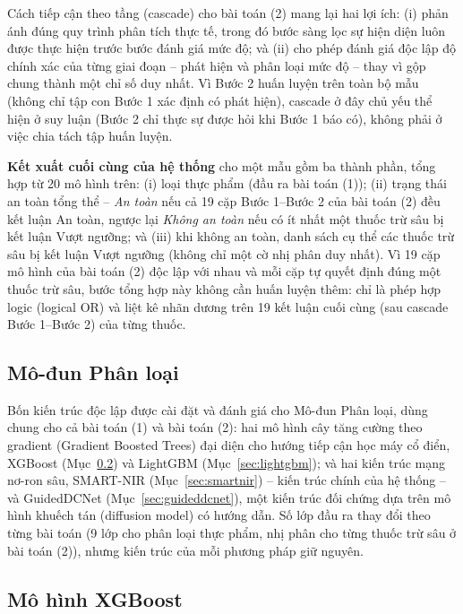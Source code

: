 \documentclass[10pt,twocolumn,twoside]{article}
\begin{document}
Cách tiếp cận theo tầng (cascade) cho bài toán (2) mang lại hai lợi ích: (i)
phản ánh đúng quy trình phân tích thực tế, trong đó bước sàng lọc sự hiện
diện luôn được thực hiện trước bước đánh giá mức độ; và (ii) cho phép đánh
giá độc lập độ chính xác của từng giai đoạn -- phát hiện và phân loại mức
độ -- thay vì gộp chung thành một chỉ số duy nhất. Vì Bước 2 huấn luyện
trên toàn bộ mẫu (không chỉ tập con Bước 1 xác định có phát hiện), cascade ở
đây chủ yếu thể hiện ở suy luận (Bước 2 chỉ thực sự được hỏi khi Bước 1 báo
có), không phải ở việc chia tách tập huấn luyện.

\textbf{Kết xuất cuối cùng của hệ thống} cho một mẫu gồm ba thành phần, tổng
hợp từ 20 mô hình trên: (i) loại thực phẩm (đầu ra bài toán (1)); (ii) trạng
thái an toàn tổng thể -- \emph{An toàn} nếu cả 19 cặp Bước 1--Bước 2 của bài
toán (2) đều kết luận An toàn, ngược lại \emph{Không an toàn} nếu có ít nhất
một thuốc trừ sâu bị kết luận Vượt ngưỡng; và (iii) khi không an toàn, danh
sách cụ thể các thuốc trừ sâu bị kết luận Vượt ngưỡng (không chỉ một cờ nhị
phân duy nhất). Vì 19 cặp mô hình của bài toán (2) độc lập với nhau và mỗi
cặp tự quyết định đúng một thuốc trừ sâu, bước tổng hợp này không cần huấn
luyện thêm: chỉ là phép hợp logic (logical OR) và liệt kê nhãn dương trên 19
kết luận cuối cùng (sau cascade Bước 1--Bước 2) của từng thuốc.

\subsection{Mô-đun Phân loại}
\label{sec:module-clf}

Bốn kiến trúc độc lập được cài đặt và đánh giá cho Mô-đun Phân loại, dùng
chung cho cả bài toán (1) và bài toán (2): hai mô hình cây tăng cường theo
gradient (Gradient Boosted Trees) đại diện cho hướng tiếp cận học máy cổ
điển, XGBoost (Mục~\ref{sec:xgboost}) và LightGBM (Mục~\ref{sec:lightgbm});
và hai kiến trúc mạng nơ-ron sâu, SMART-NIR (Mục~\ref{sec:smartnir}) --
kiến trúc chính của hệ thống -- và GuidedDCNet (Mục~\ref{sec:guideddcnet}),
một kiến trúc đối chứng dựa trên mô hình khuếch tán (diffusion model) có
hướng dẫn. Số lớp đầu ra thay đổi theo từng bài toán (9 lớp cho phân loại
thực phẩm, nhị phân cho từng thuốc trừ sâu ở bài toán (2)), nhưng kiến trúc
của mỗi phương pháp giữ nguyên.

\subsection{Mô hình XGBoost}
\label{sec:xgboost}
\end{document}
